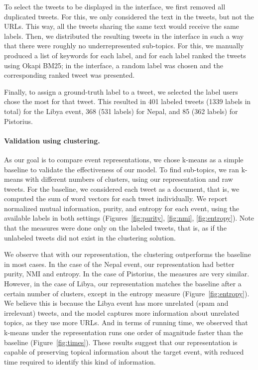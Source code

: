 To select the tweets to be displayed in the interface, we first removed all
duplicated tweets.
%
For this, we only considered the text in the tweets, but not the URLs.
%
This way, all the tweets sharing the same text would receive the same labels.
% 
Then, we distributed the resulting tweets in the interface in such a way that
there were roughly no underrepresented sub-topics.
%
For this, we manually produced a list of keywords for each label, and for each
label ranked the tweets using Okapi BM25;  in the interface, a random label was
chosen and the corresponding ranked tweet was presented.


Finally, to assign a ground-truth label to a tweet, we selected the label users
chose the most for that tweet.
%
This resulted in 401 labeled tweets (1339 labels in total) for the Libya event,
368 (531 labels) for Nepal, and 85 (362 labels) for Pistorius.


\paragraph{Validation using clustering.}
%
As our goal is to compare event representations, we chose k-means as a simple
baseline to validate the effectiveness of our model.
%
To find sub-topics, we ran k-means with different numbers of clusters, using our
representation and raw tweets.
%
For the baseline, we considered each tweet as a document, that is, we computed
the sum of word vectors for each tweet individually.
%
We report normalized mutual information, purity, and entropy for each event,
using the available labels in both settings (Figures~\ref{fig:purity},
\ref{fig:nmi}, \ref{fig:entropy}).
%
Note that the measures were done only on the labeled tweets, that is, as if the
unlabeled tweets did not exist in the clustering solution.


We observe that with our representation, the clustering outperforms the baseline
in most cases. 
%
In the case of the Nepal event, our representation had better purity, NMI and
entropy. 
%
In the case of Pistorius, the measures are very similar. 
%
However, in the case of Libya, our representation matches the baseline after a
certain number of clusters, except in the entropy measure
(Figure~\ref{fig:entropy}).
%
We believe this is because the Libya event has more unrelated (spam and
irrelevant) tweets, and the model captures more information about unrelated
topics, as they use more URLs.
%
And in terms of running time, we observed that k-means under the representation
runs one order of magnitude faster than the baseline (Figure~\ref{fig:times}). 
%
These results suggest that our representation is capable of preserving topical
information about the target event, with reduced time required to identify this
kind of information. 
%

